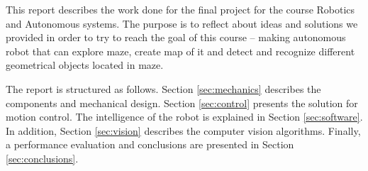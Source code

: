 This report describes the work done for the final project for the course Robotics and Autonomous systems. The purpose is to reflect about ideas and solutions we provided in order to try to reach the goal of this course – making autonomous robot that can explore maze, create map of it and detect and recognize different geometrical objects located in maze.

The report is structured as follows. Section \ref{sec:mechanics} describes the components and mechanical design. Section \ref{sec:control} presents the solution for motion control. The intelligence of the robot is explained in Section \ref{sec:software}. In addition, Section \ref{sec:vision} describes the computer vision algorithms. Finally, a performance evaluation and conclusions are presented in Section \ref{sec:conclusions}.